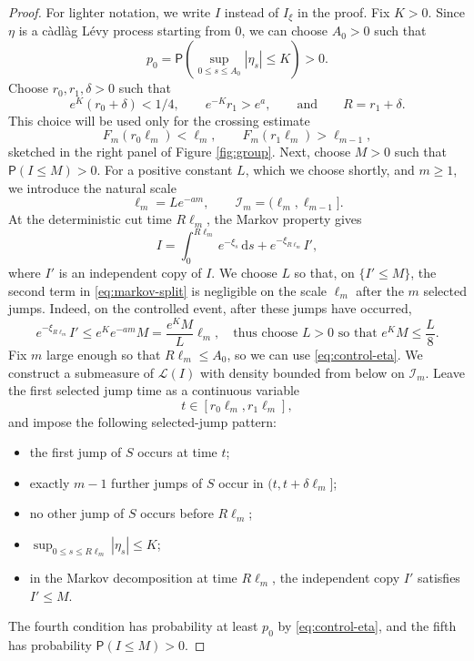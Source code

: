 \documentclass[11pt]{article}
\newcommand{\Prob}{\mathsf P}
\newcommand{\1}{\mathbf 1}
\newcommand{\law}{\mathcal L}
\newcommand{\dd}{\mathrm d}
\begin{document}
\begin{proof}
For lighter notation, we write $I$ instead of $I_\xi$ in the proof. Fix $K>0$. Since $\eta$ is a c\`adl\`ag L\'evy process starting from $0$, we can choose $A_0>0$ such that
\begin{equation}\label{eq:control-eta}
 p_0=
 \Prob\left(\sup_{0\leq s\leq A_0}|\eta_s|\leq K\right)>0.
\end{equation}
Choose $r_0,r_1,\delta>0$ such that
\begin{equation}\label{eq:constant-choice}
 e^K(r_0+\delta)<1/4,
 \qquad
 e^{-K}r_1>e^a,
 \qquad \text{and} \qquad
 R=r_1+\delta.
\end{equation}
This choice will be used only for the crossing estimate
\[
 F_m(r_0\ell_m)<\ell_m,
 \qquad
 F_m(r_1\ell_m)>\ell_{m-1},
\]
sketched in the right panel of Figure \ref{fig:group}. Next, choose $M>0$ such that $\Prob(I\leq M)>0$. For a positive constant $L$, which we choose shortly, and $m\geq1$, we introduce the natural scale
\begin{equation}\label{eq:scale}
 \ell_m=L e^{-am},
 \qquad
 \mathcal I_m=(\ell_m,\ell_{m-1}].
\end{equation}
At the deterministic cut time $R\ell_m$, the Markov property gives
\begin{equation}\label{eq:markov-split}
 I=
 \int_0^{R\ell_m}e^{-\xi_s}\,\dd s
 +e^{-\xi_{R\ell_m}}I',
\end{equation}
where $I'$ is an independent copy of $I$.
We choose $L$ so that, on $\{I'\leq M\}$, the second term in \eqref{eq:markov-split} is negligible on the scale $\ell_m$ after the $m$ selected jumps. Indeed, on the controlled event, after these jumps have occurred,
\begin{equation}
 e^{-\xi_{R\ell_m}}I'
 \leq e^K e^{-am}M
 =
 \frac{e^K M}{L}\ell_m,
 \quad
 \text{thus choose $L>0$ so that
 $e^K M\leq \frac{L}{8}$}.
\end{equation}
Fix $m$ large enough so that $R\ell_m\leq A_0$, so we can use \eqref{eq:control-eta}. We construct a submeasure of $\law(I)$ with density bounded from below on $\mathcal I_m$. Leave the first selected jump time as a continuous variable
\[
 t\in[r_0\ell_m,r_1\ell_m],
\]
and impose the following selected-jump pattern:
\begin{itemize}
 \item the first jump of $S$ occurs at time $t$;
 \item exactly $m-1$ further jumps of $S$ occur in $(t,t+\delta\ell_m]$;
 \item no other jump of $S$ occurs before $R\ell_m$;
 \item $\displaystyle \sup_{0\leq s\leq R\ell_m}|\eta_s|\leq K$;
 \item in the Markov decomposition at time $R\ell_m$, the independent copy $I'$ satisfies $I'\leq M$.
\end{itemize}
The fourth condition has probability at least $p_0$ by \eqref{eq:control-eta}, and the fifth has probability $\Prob(I\leq M)>0$.


\end{proof}
\end{document}
